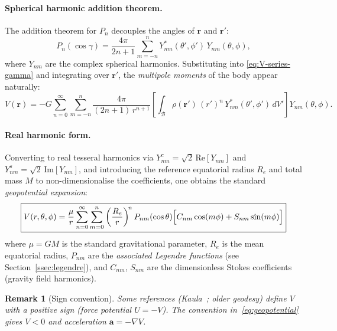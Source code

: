 \documentclass[11pt]{article}
\newtheorem{remark}{Remark}
\begin{document}
\paragraph{Spherical harmonic addition theorem.}
The addition theorem for $P_n$ decouples the angles of $\mathbf{r}$ and
$\mathbf{r}'$:
\begin{equation}
  P_n(\cos\gamma)
  = \frac{4\pi}{2n+1}\sum_{m=-n}^{n}
    Y_{nm}^*(\theta',\phi')\,Y_{nm}(\theta,\phi),
  \label{eq:addition-theorem}
\end{equation}
where $Y_{nm}$ are the complex spherical harmonics.  Substituting into
\eqref{eq:V-series-gamma} and integrating over $\mathbf{r}'$, the
\emph{multipole moments} of the body appear naturally:
\begin{equation}
  V(\mathbf{r})
  = -G\sum_{n=0}^\infty\sum_{m=-n}^{n}
    \frac{4\pi}{(2n+1)\,r^{n+1}}
    \!\left[\int_{\mathcal{B}}\rho(\mathbf{r}')\,(r')^n\,Y_{nm}^*(\theta',\phi')\,dV'\right]
    Y_{nm}(\theta,\phi).
  \label{eq:V-multipole-complex}
\end{equation}

\paragraph{Real harmonic form.}
Converting to real tesseral harmonics via
$Y_{nm}^c = \sqrt{2}\,\mathrm{Re}[Y_{nm}]$ and $Y_{nm}^s = \sqrt{2}\,\mathrm{Im}[Y_{nm}]$,
and introducing the reference equatorial radius $R_e$ and total mass $M$ to
non-dimensionalise the coefficients, one obtains the standard
\emph{geopotential expansion}:
\begin{equation}
  \boxed{
  V(r,\theta,\phi)
  = \frac{\mu}{r}\sum_{n=0}^\infty\sum_{m=0}^{n}
    \left(\frac{R_e}{r}\right)^{\!n}
    P_{nm}(\cos\theta)
    \Bigl[C_{nm}\cos(m\phi) + S_{nm}\sin(m\phi)\Bigr]
  }
  \label{eq:geopotential}
\end{equation}
where $\mu = GM$ is the standard gravitational parameter, $R_e$ is the mean
equatorial radius, $P_{nm}$ are the \emph{associated Legendre functions}
(see Section~\ref{ssec:legendre}), and $C_{nm}$, $S_{nm}$ are the dimensionless
Stokes coefficients (gravity field harmonics).

\begin{remark}[Sign convention]
  Some references (Kaula~\cite{Kaula1966}; older geodesy) define $V$ with a
  positive sign (force potential $U = -V$).  The convention
  in~\eqref{eq:geopotential} gives $V < 0$ and acceleration
  $\mathbf{a} = -\nabla V$.
\end{remark}
\end{document}
